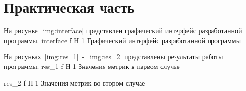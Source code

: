 \chapter{Практическая часть}

На рисунке~\ref{img:interface} представлен графический интерфейс разработанной программы.
	{interface}
	{f}
	{H}
	{1\textwidth}
	{Графический интерфейс разработанной программы}
	
\newpage

На рисунках~\ref{img:res_1}~-~\ref{img:res_2} представлены результаты работы программы.
	{res_1}
	{f}
	{H}
	{1\textwidth}
	{Значения метрик в первом случае}

	{res_2}
	{f}
	{H}
	{1\textwidth}
	{Значения метрик во втором случае}